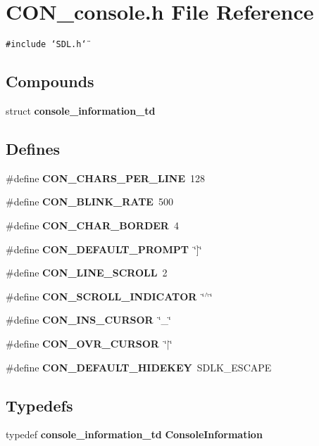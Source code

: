 \section{CON\_\-console.h File Reference}
\label{CON__console_8h}
{\tt \#include \char`\"{}SDL.h\char`\"{}}\par
\subsection*{Compounds}
\begin{CompactItemize}
\item 
struct {\bf console\_\-information\_\-td}
\end{CompactItemize}
\subsection*{Defines}
\begin{CompactItemize}
\item 
\#define {\bf CON\_\-CHARS\_\-PER\_\-LINE}\ 128
\item 
\#define {\bf CON\_\-BLINK\_\-RATE}\ 500
\item 
\#define {\bf CON\_\-CHAR\_\-BORDER}\ 4
\item 
\#define {\bf CON\_\-DEFAULT\_\-PROMPT}\ \char`\"{}]\char`\"{}
\item 
\#define {\bf CON\_\-LINE\_\-SCROLL}\ 2
\item 
\#define {\bf CON\_\-SCROLL\_\-INDICATOR}\ \char`\"{}$^\wedge$\char`\"{}
\item 
\#define {\bf CON\_\-INS\_\-CURSOR}\ \char`\"{}\_\-\char`\"{}
\item 
\#define {\bf CON\_\-OVR\_\-CURSOR}\ \char`\"{}$|$\char`\"{}
\item 
\#define {\bf CON\_\-DEFAULT\_\-HIDEKEY}\ SDLK\_\-ESCAPE
\end{CompactItemize}
\subsection*{Typedefs}
\begin{CompactItemize}
\item 
typedef {\bf console\_\-information\_\-td} {\bf Console\-Information}
\end{CompactItemize}

